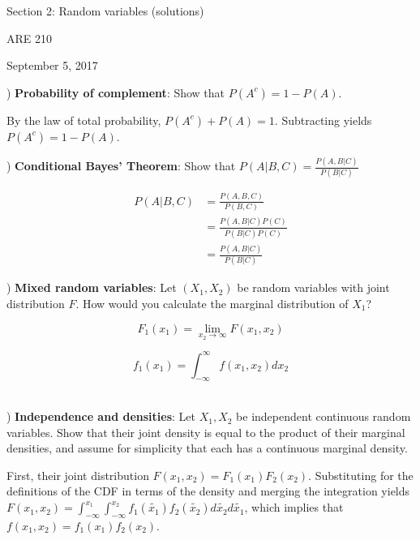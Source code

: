 \documentclass[12pt,english]{article}
\begin{document}
\begin{center}
{\Large{}Section 2: Random variables (solutions)}
\par\end{center}{\Large \par}

\begin{center}
ARE 210
\par\end{center}

\begin{center}
September 5, 2017
\par\end{center}

) \textbf{Probability of complement}: Show that $P(A^{c}) = 1 - P(A)$.
\vspace{1em}

By the law of total probability, $P(A^{c}) + P(A) = 1$. Subtracting yields $P(A^{c}) = 1 - P(A)$.

\vspace{1em}
) \textbf{Conditional Bayes' Theorem}: Show that $P(A | B, C) = \frac{P(A, B | C)}{P(B | C)}$
\vspace{1em}

\begin{align*}
P(A | B, C) & = \frac{P(A, B, C)}{P(B, C)} \\
& = \frac{P(A, B | C) P(C)}{P(B | C) P(C)} \\
& = \frac{P(A, B |C)}{P(B | C)}
\end{align*}

\vspace{1em}
) \textbf{Mixed random variables}: Let $(X_{1}, X_{2})$ be random variables with joint distribution $F$. How would you calculate the marginal distribution of $X_{1}$?
\vspace{1em}

$$ F_{1}(x_{1}) = \lim_{x_{2} \to \infty} F(x_{1}, x_{2}) $$

$$ f_{1}(x_{1}) = \int_{-\infty}^{\infty} f(x_{1}, x_{2}) dx_{2} $$\

\vspace{1em}
) \textbf{Independence and densities}: Let $X_{1}, X_{2}$ be independent continuous random variables. Show that their joint density is equal to the product of their marginal densities, and assume for simplicity that each has a continuous marginal density.

First, their joint distribution $F(x_{1}, x_{2}) = F_{1}(x_{1}) F_{2}(x_{2})$. Substituting for the definitions of the CDF in terms of the density and merging the integration yields $F(x_{1}, x_{2}) = \int_{-\infty}^{x_{1}} \int_{-\infty}^{x_{2}} f_{1}(\widetilde{x_{1}}) f_{2}(\widetilde{x_{2}}) d\widetilde{x_{2}} d\widetilde{x_{1}}$, which implies that $f(x_{1}, x_{2}) = f_{1}(x_{1}) f_{2}(x_{2})$.
\end{document}
